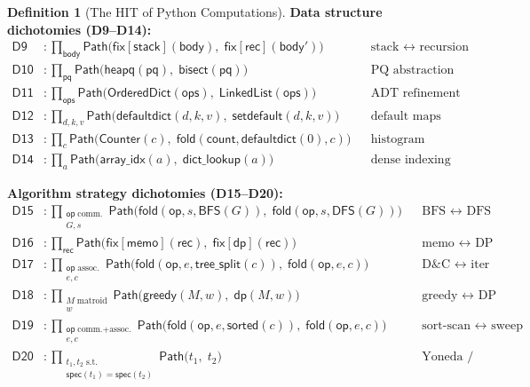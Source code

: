 \documentclass[11pt,a4paper]{report}
\theoremstyle{definition}
\newtheorem{definition}{Definition}[chapter]
\theoremstyle{plain}
\newcommand{\Path}{\mathsf{Path}}
\newcommand{\fold}{\mathsf{fold}}
\begin{document}
\begin{definition}[The HIT of Python Computations]
\smallskip
\noindent\textbf{Data structure dichotomies (D9--D14):}
\begin{align}
  \mathsf{D9} &: \prod_{\mathsf{body}}
    \Path\bigl(\mathsf{fix}[\mathsf{stack}](\mathsf{body}),\;
    \mathsf{fix}[\mathsf{rec}](\mathsf{body}')\bigr)
    & &\text{stack $\leftrightarrow$ recursion} \\
  \mathsf{D10} &: \prod_{\mathsf{pq}}
    \Path\bigl(\mathsf{heapq}(\mathsf{pq}),\;
    \mathsf{bisect}(\mathsf{pq})\bigr)
    & &\text{PQ abstraction} \\
  \mathsf{D11} &: \prod_{\mathsf{ops}}
    \Path\bigl(\mathsf{OrderedDict}(\mathsf{ops}),\;
    \mathsf{LinkedList}(\mathsf{ops})\bigr)
    & &\text{ADT refinement} \\
  \mathsf{D12} &: \prod_{d, k, v}
    \Path\bigl(\mathsf{defaultdict}(d, k, v),\;
    \mathsf{setdefault}(d, k, v)\bigr)
    & &\text{default maps} \\
  \mathsf{D13} &: \prod_{c}
    \Path\bigl(\mathsf{Counter}(c),\;
    \fold(\mathsf{count}, \mathsf{defaultdict}(0), c)\bigr)
    & &\text{histogram} \\
  \mathsf{D14} &: \prod_{a}
    \Path\bigl(\mathsf{array\_idx}(a),\;
    \mathsf{dict\_lookup}(a)\bigr)
    & &\text{dense indexing}
\end{align}

\smallskip
\noindent\textbf{Algorithm strategy dichotomies (D15--D20):}
\begin{align}
  \mathsf{D15} &: \prod_{\substack{\mathsf{op}\;\text{comm.} \\ G, s}}
    \Path\bigl(\fold(\mathsf{op}, s, \mathsf{BFS}(G)),\;
    \fold(\mathsf{op}, s, \mathsf{DFS}(G))\bigr)
    & &\text{BFS $\leftrightarrow$ DFS} \\
  \mathsf{D16} &: \prod_{\mathsf{rec}}
    \Path\bigl(\mathsf{fix}[\mathsf{memo}](\mathsf{rec}),\;
    \mathsf{fix}[\mathsf{dp}](\mathsf{rec})\bigr)
    & &\text{memo $\leftrightarrow$ DP} \\
  \mathsf{D17} &: \prod_{\substack{\mathsf{op}\;\text{assoc.} \\ e, c}}
    \Path\bigl(\fold(\mathsf{op}, e, \mathsf{tree\_split}(c)),\;
    \fold(\mathsf{op}, e, c)\bigr)
    & &\text{D\&C $\leftrightarrow$ iter} \\
  \mathsf{D18} &: \prod_{\substack{M\;\text{matroid} \\ w}}
    \Path\bigl(\mathsf{greedy}(M, w),\;
    \mathsf{dp}(M, w)\bigr)
    & &\text{greedy $\leftrightarrow$ DP} \\
  \mathsf{D19} &: \prod_{\substack{\mathsf{op}\;\text{comm.+assoc.} \\ e, c}}
    \Path\bigl(\fold(\mathsf{op}, e, \mathsf{sorted}(c)),\;
    \fold(\mathsf{op}, e, c)\bigr)
    & &\text{sort-scan $\leftrightarrow$ sweep} \\
  \mathsf{D20} &: \prod_{\substack{t_1, t_2\;\text{s.t.} \\
    \mathsf{spec}(t_1) = \mathsf{spec}(t_2)}}
    \Path\bigl(t_1,\; t_2\bigr)
    & &\text{Yoneda / spec unify}
\end{align}


\end{definition}
\end{document}
